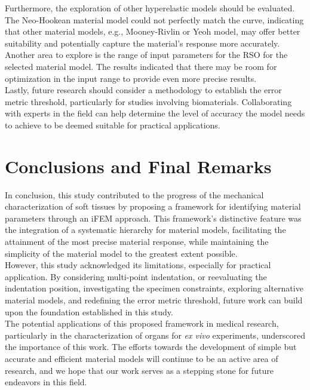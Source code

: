 Furthermore, the exploration of other hyperelastic models should be evaluated. The Neo-Hookean material 
model could not perfectly match the curve, indicating that other material models, e.g., Mooney-Rivlin or Yeoh model, may 
offer better suitability and potentially capture the material's response more accurately. Another area to explore is the range
 of input parameters for the RSO for the selected material model. The results indicated that there may be room 
for optimization in the input range to provide even more precise results.\\

Lastly, future research should consider a methodology to establish the error metric threshold, particularly for studies
involving biomaterials. Collaborating with experts in the field can help determine the level of accuracy the model 
needs to achieve to be deemed suitable for practical applications.

\section{Conclusions and Final Remarks}

In conclusion, this study contributed to the progress of the mechanical characterization of soft tissues
by proposing a framework for identifying material parameters through an iFEM approach. This framework's
distinctive feature was the integration of a systematic hierarchy for material models, facilitating the 
attainment of the most precise material response, while maintaining the simplicity of the material model to the 
greatest extent possible.\\

However, this study acknowledged its limitations, especially for practical application. By considering
multi-point indentation, or reevaluating the indentation position, investigating the specimen constraints, 
exploring alternative material models, and redefining the error metric threshold, future work can build upon the 
foundation established in this study.\\

The potential applications of this proposed framework in medical research, particularly in the characterization 
of organs for \textit{ex vivo} experiments, underscored the importance of this work. The efforts towards 
the development of simple but accurate and efficient material models will continue to be an active area
of research, and we hope that our work serves as a stepping stone for future endeavors in this field. 

